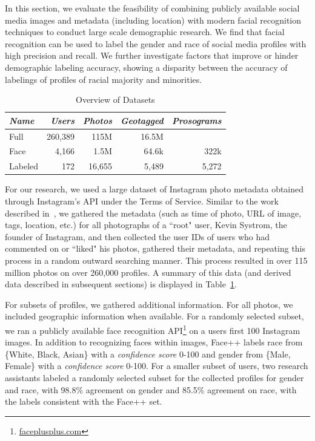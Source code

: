 

In this section, we evaluate the feasibility of combining publicly available social media images and metadata (including location) with modern facial recognition techniques to conduct large scale demographic research.
We find that facial recognition can be used to label the gender and race of social media profiles with high precision and recall.
We further investigate factors that improve or hinder demographic labeling accuracy, showing a disparity between the accuracy of labelings of profiles of racial majority and minorities.

\begin{table}[h]
\centering
\begin{tabular}{l r r r r}
\emph{Name} & \emph{Users} & \emph{Photos} & \emph{Geotagged} & \emph{Prosograms} \\ \hline
Full & 260,389 & 115M & 16.5M & \\ 
Face & 4,166 & 1.5M & 64.6k & 322k \\ 
Labeled & 172 & 16,655 & 5,489 & 5,272 \\ 
\end{tabular}
\caption{Overview of Datasets \label{tab:data}}
\end{table}

For our research, we used a large dataset of Instagram photo metadata obtained through Instagram's API under the Terms of Service.
Similar to the work described in~, we gathered the metadata (such as time of photo, URL of image, tags, location, etc.) for all photographs of a ``root" user, Kevin Systrom, the founder of Instagram, and then collected the user IDs of users who had commented on or ``liked" his photos, gathered their metadata, and repeating this process in a random outward searching manner.
This process resulted in over 115 million photos on over 260,000 profiles.
A summary of this data (and derived data described in subsequent sections) is displayed in Table~\ref{tab:data}.

For subsets of profiles, we gathered additional information.
For all photos, we included geographic information when available.
For a randomly selected subset, we ran a publicly available face recognition API\footnote{\url{faceplusplus.com}} on a users first 100 Instagram images.
In addition to recognizing faces within images, Face++ labels race from \{White, Black, Asian\} with a \emph{confidence score} 0-100 and gender from \{Male, Female\} with a \emph{confidence score} 0-100.
For a smaller subset of users, two research assistants labeled a randomly selected subset for the collected profiles for gender and race, with 98.8\% agreement on gender and 85.5\% agreement on race, with the labels consistent with the Face++ set.


